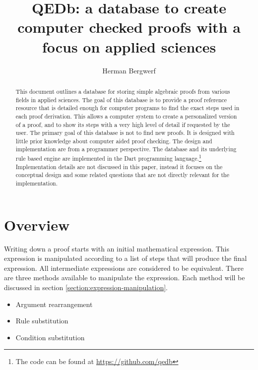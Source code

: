 \documentclass{article}
\begin{document}
\author{Herman Bergwerf}
\title{QEDb: a database to create computer checked proofs with a focus on applied sciences}
\maketitle

\begin{abstract}
This document  outlines a database for storing simple algebraic proofs from various fields in applied sciences.  The goal of this database is to provide a proof reference resource that is detailed enough for computer programs to find the exact steps used in each proof derivation. This allows a computer system to create a personalized version of a proof, and to show its steps with a very high level of detail if requested by the user. The primary goal of this database is not to find new proofs. It is designed with little prior knowledge about computer aided proof checking. The design and implementation are from a programmer perspective. The database and its underlying rule based engine are implemented in the Dart programming language.\footnote{The code can be found at \url{https://github.com/qedb}} Implementation details are not discussed in this paper, instead it focuses on the conceptual design and some related questions that are not directly relevant for the implementation.
\end{abstract}
\section{Overview}
Writing down a proof starts with an initial mathematical expression. This expression is manipulated according to a list of steps that will produce the final expression. All intermediate expressions are considered to be equivalent. There are three methods available to manipulate the expression. Each method will be discussed in section \ref{section:expression-manipulation}.
\begin{itemize}
\item Argument rearrangement
\item Rule substitution
\item Condition substitution
\end{itemize}
\end{document}
